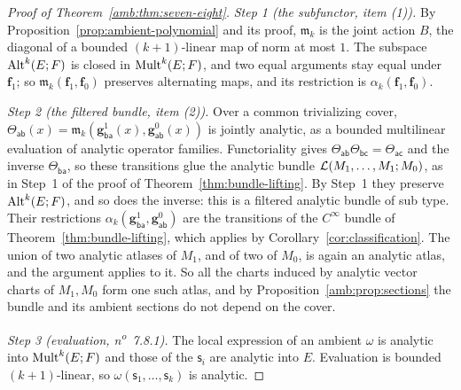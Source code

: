 \begin{proof}[Proof of Theorem~\ref{amb:thm:seven-eight}]
\emph{Step 1 (the subfunctor, item (1)).} By Proposition~\ref{prop:ambient-polynomial} and its proof, $\mathfrak m_k$ is the joint action $B$, the diagonal of a bounded $(k+1)$\nobreakdash-linear map of norm at most $1$. The subspace $\operatorname{Alt}^k(E;F)$ is closed in $\operatorname{Mult}^k(E;F)$, and two equal arguments stay equal under $\mathbf f_1$; so $\mathfrak m_k(\mathbf f_1,\mathbf f_0)$ preserves alternating maps, and its restriction is $\alpha_k(\mathbf f_1,\mathbf f_0)$.

\emph{Step 2 (the filtered bundle, item (2)).} Over a common trivializing cover, $\Theta_{\mathsf{ab}}(x)=\mathfrak m_k(\mathbf g^1_{\mathsf{ba}}(x),\mathbf g^0_{\mathsf{ab}}(x))$ is jointly analytic, as a bounded multilinear evaluation of analytic operator families. Functoriality gives $\Theta_{\mathsf{ab}}\Theta_{\mathsf{bc}}=\Theta_{\mathsf{ac}}$ and the inverse $\Theta_{\mathsf{ba}}$, so these transitions glue the analytic bundle $\mathcal L(M_1,\dots,M_1;M_0)$, as in Step~1 of the proof of Theorem~\ref{thm:bundle-lifting}. By Step~1 they preserve $\operatorname{Alt}^k(E;F)$, and so does the inverse: this is a filtered analytic bundle of sub type. Their restrictions $\alpha_k(\mathbf g^1_{\mathsf{ba}},\mathbf g^0_{\mathsf{ab}})$ are the transitions of the $C^\infty$ bundle of Theorem~\ref{thm:bundle-lifting}, which applies by Corollary~\ref{cor:classification}. The union of two analytic atlases of $M_1$, and of two of $M_0$, is again an analytic atlas, and the argument applies to it. So all the charts induced by analytic vector charts of $M_1,M_0$ form one such atlas, and by Proposition~\ref{amb:prop:sections} the bundle and its ambient sections do not depend on the cover.

\emph{Step 3 (evaluation, n\textsuperscript{o}~7.8.1).} The local expression of an ambient $\omega$ is analytic into $\operatorname{Mult}^k(E;F)$ and those of the $\mathsf s_i$ are analytic into $E$. Evaluation is bounded $(k+1)$\nobreakdash-linear, so $\omega(\mathsf s_1,\dots,\mathsf s_k)$ is analytic.


\end{proof}
